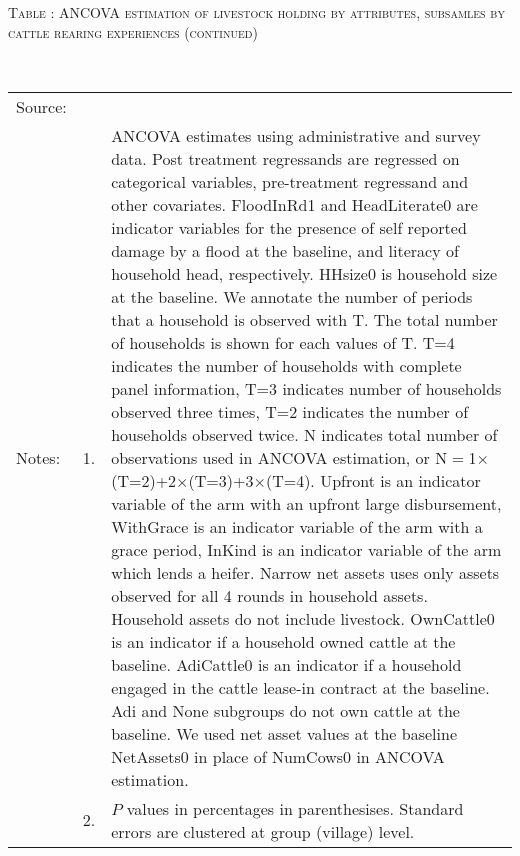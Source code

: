 \addtocounter{table}{-1}
\hspace{-1cm}\begin{minipage}[t]{14cm}
\hfil\textsc{\normalsize Table \thetable: ANCOVA estimation of livestock holding by attributes, subsamles by cattle rearing experiences (continued)\label{tab ANCOVA livestock holding Experience attributes 2}}\\
\setlength{\tabcolsep}{1pt}
\setlength{\baselineskip}{8pt}
\renewcommand{\arraystretch}{.52}
\hfil{}\\
\renewcommand{\arraystretch}{.8}
\setlength{\tabcolsep}{1pt}
\begin{tabular}{>{\hfill\scriptsize}p{1cm}<{}>{\hfill\scriptsize}p{.25cm}<{}>{\scriptsize}p{12cm}<{\hfill}}
Source:& \multicolumn{2}{l}{\scriptsize Estimated with GUK administrative and survey data.}\\
Notes: & 1. & ANCOVA estimates using administrative and survey data. Post treatment regressands are regressed on categorical variables, pre-treatment regressand and other covariates. \textsf{FloodInRd1} and \textsf{HeadLiterate0} are indicator variables for the presence of self reported damage by a flood at the baseline, and literacy of household head, respectively. \textsf{HHsize0} is household size at the baseline. We annotate the number of periods that a household is observed with \textsf{T}. The total number of households is shown for each values of \textsf{T}. \textsf{T=4} indicates the number of households with complete panel information, \textsf{T=3} indicates number of households observed three times, \textsf{T=2} indicates the number of households observed twice. \textsf{N} indicates total number of observations used in ANCOVA estimation, or \textsf{N$=$1$\times$(T=2)+2$\times$(T=3)+3$\times$(T=4)}.  \textsf{Upfront} is an indicator variable of the arm with an upfront large disbursement, \textsf{WithGrace} is an indicator variable of the arm with a grace period, \textsf{InKind} is an indicator variable of the arm which lends a heifer. Narrow net assets uses only assets observed for all 4 rounds in household assets. Household assets do not include livestock. \textsf{OwnCattle0} is an indicator if a household owned cattle at the baseline. \textsf{AdiCattle0} is an indicator if a household engaged in the cattle lease-in contract at the baseline.  \textsf{Adi} and \textsf{None} subgroups do not own cattle at the baseline. We used net asset values at the baseline \textsf{NetAssets0} in place of \textsf{NumCows0} in ANCOVA estimation.\\
& 2. & $P$ values in percentages in parenthesises. Standard errors are clustered at group (village) level.
\end{tabular}
\end{minipage}



